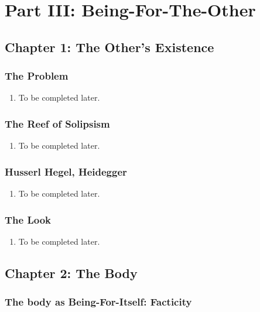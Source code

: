 \section{Part III: Being-For-The-Other}

\subsection{Chapter 1: The Other's Existence}

\subsubsection{The Problem}

\begin{enumerate}
  \item To be completed later.
\end{enumerate}

\subsubsection{The Reef of Solipsism}

\begin{enumerate}
  \item To be completed later.
\end{enumerate}

\subsubsection{Husserl Hegel, Heidegger}

\begin{enumerate}
  \item To be completed later.
\end{enumerate}

\subsubsection{The Look}

\begin{enumerate}
  \item To be completed later.
\end{enumerate}

\subsection{Chapter 2: The Body}

\subsubsection{The body as Being-For-Itself: Facticity}

